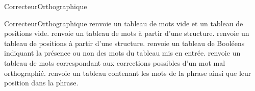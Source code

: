 \begin{tad}
	\tadParametres{}
	\begin{tadOperations}{CorrecteurOrthographique}
			{\tadUnParam{           }}%
			{}
			{}%
			{}
			{}%
			{}
			{}%
			{}
			{}%
			{}
			{\tadUnParam{\chaine}}%
			{}
	\end{tadOperations}
		
	\begin{tadSemantiques}{CorrecteurOrthographique}
			{renvoie un tableau de mots vide et un tableau de positions vide.}
			{renvoie un tableau de mots à partir d'une structure.}
			{renvoie un tableau de positions à partir d'une structure.}
			{renvoie un tableau de Booléens indiquant la présence ou non des mots du tableau mis en entrée.}
			{renvoie un tableau de mots correspondant aux corrections possibles d’un mot mal orthographi\'e.}
			{renvoie un tableau contenant les mots de la phrase ainsi que leur position dans la phrase.}
	\end{tadSemantiques}
		
		
\end{tad}
